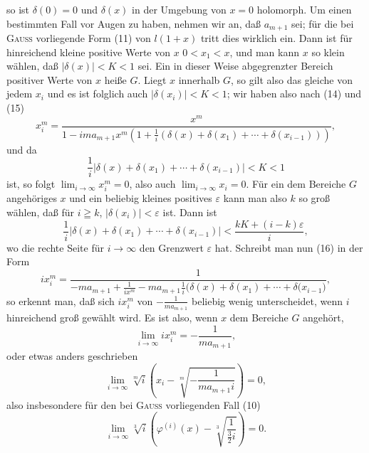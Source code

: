 \clearpage{}
\begingroup\small
\makeatletter\tagsleft@true\let\veqno\@@leqno\makeatother
\noindent so ist \(\delta(0)=0\) und \(\delta(x)\) in der Umgebung von \(x=0\) holomorph. Um einen bestimmten Fall vor Augen zu haben, nehmen wir an, daß \(a_{m+1}\)  sei; für die bei \textsc{Gauss} vorliegende Form (11) von \(l(1+x)\) tritt dies wirklich ein. Dann ist für hinreichend kleine positive Werte von \(x\)  \(0<x_1<x\), und man kann  \(x\) so klein wählen, daß \(|\delta(x)|<K<1\) sei. Ein in dieser Weise abgegrenzter Bereich positiver Werte von \(x\) heiße \(G\). Liegt \(x\) innerhalb \(G\), so gilt also das gleiche von jedem \(x_i\) und es ist folglich auch \(|\delta(x_i)|<K<1\); wir haben also nach (14) und (15)
\begin{equation}
x_i^m=\frac{x^m}{1-ima_{m+1}x^m\left(1+\frac1i(\delta(x)+\delta(x_1)+\cdots+\delta(x_{i-1}))\right)},\tag*{(16)}
\end{equation}
\noindent und da
\[
\frac1i|\delta(x)+\delta(x_1)+\cdots+\delta(x_{i-1})|<K<1
\]
\noindent ist, so folgt \(\displaystyle\lim_{i\to\infty}x_i^m=0\), also auch \(\displaystyle\lim_{i\to\infty}x_i=0\). Für ein dem Bereiche \(G\) angehöriges \(x\) und ein beliebig kleines positives \(\varepsilon\) kann man also \(k\) so groß wählen, daß für \(i\geqq k\), \(|\delta(x_i)|<\varepsilon\) ist. Dann ist
\[
\frac1i|\delta(x)+\delta(x_1)+\cdots+\delta(x_{i-1})|<\frac{kK+(i-k)\varepsilon}{i},
\]
\noindent wo die rechte Seite für \(i\to\infty\) den Grenzwert \(\varepsilon\) hat. Schreibt man nun (16) in der Form
\[
ix_i^m=\frac1{-ma_{m+1}+\frac1{ix^m}-ma_{m+1}\frac1i\bigl(\delta(x)+\delta(x_1)+\cdots+\delta(x_{i-1}\bigr)},
\]
\noindent so erkennt man, daß sich \(ix_i^m\) von \(-\frac1{ma_{m+1}}\) beliebig wenig unterscheidet, wenn \(i\) hinreichend groß gewählt wird. Es ist also, wenn \(x\) dem Bereiche \(G\) angehört,
\[
\lim_{i\to\infty}ix_i^m=-\frac1{ma_{m+1}},
\]
\noindent oder etwas anders geschrieben
\begin{equation}
\lim_{i\to\infty}\sqrt[m]{i}\left(x_i-\sqrt[m]{-\frac1{ma_{m+1}i}}\right)=0,\tag*{(17)}
\end{equation}
\noindent also insbesondere für den bei \textsc{Gauss} vorliegenden Fall (10)
\begin{equation}
\lim_{i\to\infty}\sqrt[3]{i}\left(\varphi^{(i)}(x)-\sqrt[3]{\frac1{\frac32 i}}\right)=0.\tag*{(18)}
\end{equation}

